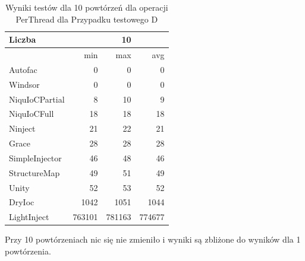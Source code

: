 \documentclass[12pt]{article}
\begin{document}
\begin{table}[H]
\captionsetup{belowskip=0pt,aboveskip=0pt}
\begin{center}
\begin{small}
	\begin{tabular}{ | l | r r r | }
    		\hline
Liczba & & 10 & \\ \hline
 & min & max & avg \\ \hline
Autofac & 0 & 0 & 0 \\ \hline
Windsor & 0 & 0 & 0 \\ \hline
NiquIoCPartial & 8 & 10 & 9 \\ \hline
NiquIoCFull & 18 & 18 & 18 \\ \hline
Ninject & 21 & 22 & 21 \\ \hline
Grace & 28 & 28 & 28 \\ \hline
SimpleInjector & 46 & 48 & 46 \\ \hline
StructureMap & 49 & 51 & 49 \\ \hline
Unity & 52 & 53 & 52 \\ \hline
DryIoc & 1042 & 1051 & 1044 \\ \hline
LightInject & 763101 & 781163 & 774677 \\ \hline
  	\end{tabular}
\end{small}
\end{center}
\caption{Wyniki testów dla 10 powtórzeń dla operacji PerThread dla Przypadku testowego D}
\label{TestCaseB_PerThread10}
\end{table}
Przy 10 powtórzeniach nic się nie zmieniło i wyniki są zbliżone do wyników dla 1 powtórzenia.
\end{document}
